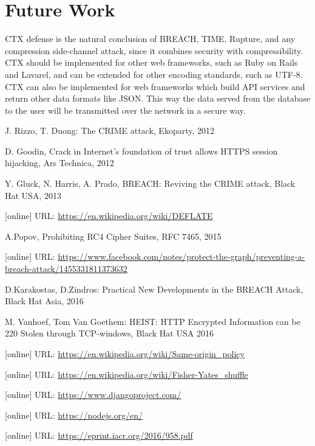 \documentclass[a4paper, 11 pt, conference]{article}  %
\begin{document}
\section{Future Work}
CTX defense is the natural conclusion of BREACH, TIME, Rupture, and any
compression side-channel attack, since it combines security with
compressibility. CTX should be implemented for other web frameworks, such as
Ruby on Rails and Lavarel, and can be extended for other encoding standards,
such as UTF-8. CTX can also be implemented for web frameworks which build API
services and return other data formats like JSON. This way the data served from
the database to the user will be transmitted over the network in a secure way.

\begin{thebibliography}{13}

 J. Rizzo, T. Duong: The CRIME attack, Ekoparty, 2012

 D. Goodin, Crack in Internet’s foundation of trust allows HTTPS session hijacking, Ars Technica, 2012

 Y. Gluck, N. Harris, A. Prado, BREACH: Reviving the CRIME attack, Black Hat USA, 2013

 [online] URL: \url{https://en.wikipedia.org/wiki/DEFLATE} 

 A.Popov, Prohibiting RC4 Cipher Suites, RFC 7465, 2015

 [online] URL: \url{https://www.facebook.com/notes/protect-the-graph/preventing-a-breach-attack/1455331811373632}

  D.Karakostas, D.Zindros: Practical New Developments in the BREACH Attack, Black Hat Asia, 2016

 M. Vanhoef, Tom Van Goethem: HEIST: HTTP Encrypted Information can be 220 Stolen through TCP-windows, Black Hat USA 2016

[online] URL: \url{https://en.wikipedia.org/wiki/Same-origin_policy} 

 [online] URL: \url{https://en.wikipedia.org/wiki/Fisher-Yates_shuffle}

 [online] URL: \url{https://www.djangoproject.com/} 

 [online] URL: \url{https://nodejs.org/en/} 

 [online] URL: \url{https://eprint.iacr.org/2016/958.pdf}

\end{thebibliography}
\end{document}
